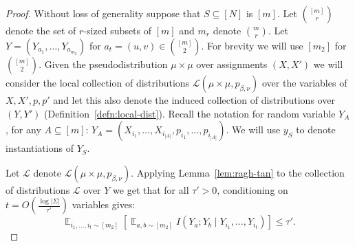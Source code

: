 \documentclass[11pt]{article}
\DeclareMathOperator*{\E}{\mathbb{E}}
\def \cL {\mathcal{L}}
\theoremstyle{definition}
\begin{document}
\begin{proof}
Without loss of generality suppose that $S \subseteq [N]$ is $[m]$. Let ${[m] \choose r}$ denote the set of $r$-sized subsets of $[m]$ and $m_r$ denote ${m \choose r}$. Let $Y = (Y_{a_1},\ldots,Y_{a_{m_2}})$ for $a_t = (u,v) \in {[m] \choose 2}$. For brevity we will use $[m_2]$ for ${[m] \choose 2}$. Given the pseudodistribution $\mu \times \mu$ over assignments $(X,X')$ we will consider the 
local collection of distributions $\cL(\mu \times \mu,p_{\beta,\nu})$ over the variables of $X,X',p,p'$ and let this also denote the induced collection of distributions over $(Y,Y')$ (Definition~\ref{defn:local-dist}). Recall the notation for random variable $Y_A$, for any $A \subseteq [m]$: $Y_A = (X_{i_1}, \ldots, X_{i_{|A|}}, p_{i_1}, \ldots, p_{i_{|A|}})$. We will use $y_S$ to denote instantiations of $Y_S$.

Let $\cL$ denote $\cL(\mu \times \mu,p_{\beta,\nu})$.
Applying Lemma~\ref{lem:ragh-tan} to the collection of  distributions $\cL$ over $Y$ we get that for all $\tau' > 0$, conditioning on $t = O(\frac{\log |\Sigma|}{\tau'})$ variables gives:
\begin{equation}\label{eq:rt-1}
\E_{i_1,\ldots,i_t \sim [m_2]}[\E_{a,b \sim [m_2]} I(Y_a ; Y_b \mid Y_{i_1}, \ldots,Y_{i_t})] \leq \tau'.
\end{equation}


\end{proof}
\end{document}
